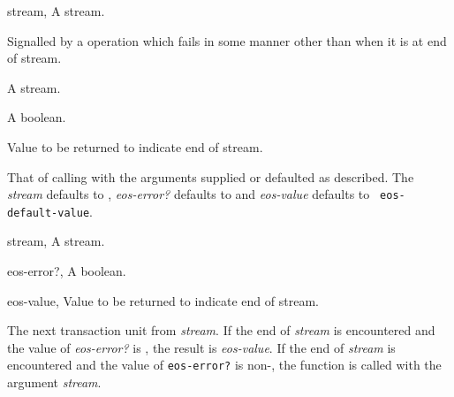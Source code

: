 \begin{optDefinition}

%
\begin{genericargs}
    \item[stream, \classref{stream}] A stream.
\end{genericargs}
%
\remarks%
Signalled by a  operation which fails in some manner other
than when it is at end of stream.

\begin{arguments}
    \item[\optional{stream}] A stream.
    \item[\optional{eos-error?}] A boolean.
    \item[\optional{eos-value}] Value to be returned to indicate end of stream.
\end{arguments}
%
\result%
That of calling  with the arguments supplied or
defaulted as described.
%
\remarks%
The {\em stream\/} defaults to , {\em
    eos-error?\/} defaults to \nil{}\/ and {\em eos-value\/} defaults to {\tt
    eos-default-value}.

\begin{genericargs}
    \item[stream, \classref{stream}] A stream.
    \item[eos-error?, \classref{object}] A boolean.
    \item[eos-value, \classref{object}] Value to be returned to indicate end of
    stream.
\end{genericargs}
%
\result%
The next transaction unit from {\em stream}.
%
\remarks%
If the end of {\em stream\/} is encountered and the value of {\em eos-error?}
is \nil{}, the result is {\em eos-value\/}. If the end of {\em stream} is
encountered and the value of {\tt eos-error?} is non-\nil{}, the function
 is called with the argument {\em stream}.


\end{optDefinition}
